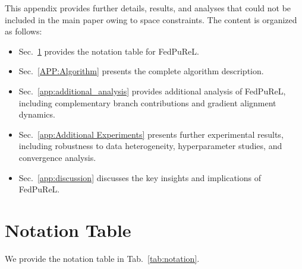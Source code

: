 \clearpage
\setcounter{page}{1}
\maketitlesupplementary
\appendix



This appendix provides further details, results, and analyses that could not be included in the main paper owing to space constraints. The content is organized as follows:
\begin{itemize}
    \item Sec.~\ref{sec:notation} provides the notation table for FedPuReL.
    \item Sec.~\ref{APP:Algorithm} presents the complete algorithm description.
    \item Sec.~\ref{app:additional_analysis} provides additional analysis of FedPuReL, including complementary branch contributions and gradient alignment dynamics.
    \item Sec.~\ref{app:Additional Experiments} presents further experimental results, including robustness to data heterogeneity, hyperparameter studies, and convergence analysis.
    \item Sec.~\ref{app:discussion} discusses the key insights and implications of FedPuReL.
\end{itemize}



\section{Notation Table}
\label{sec:notation}
We provide the notation table in Tab.~\ref{tab:notation}.

